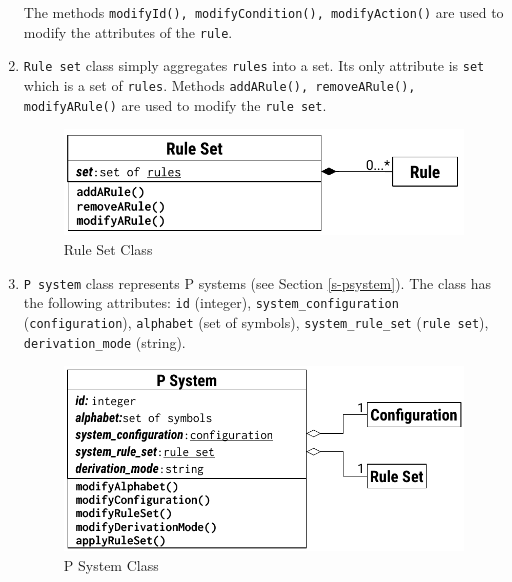 \documentclass{article}
\begin{document}
\begin{enumerate}
The methods \texttt{modifyId(), modifyCondition(), modifyAction()} are used to modify the attributes
of the \texttt{rule}.


\item \texttt{Rule set} class simply aggregates \texttt{rules} into a set. Its only attribute is
\texttt{set} which is a set of \texttt{rules}. Methods \texttt{addARule(), removeARule(),
modifyARule()} are used to modify the \texttt{rule set}.

\begin{figure}[H]
\begin{center}
    \includegraphics[scale=0.8]{figures/zzz-rule-set.pdf}
    \caption{Rule Set Class}
    \label{fig:rule-set}
\end{center}
\end{figure}


\item \texttt{P system} class represents P systems (see Section \ref{s-psystem}). The class has the
following attributes: \texttt{id} (integer), \texttt{system\_configuration} 
(\texttt{configuration}), \texttt{alphabet} (set of symbols), \texttt{system\_rule\_set} 
(\texttt{rule set}), \texttt{derivation\_mode} (string).

\begin{figure}[H]
\begin{center}
    \includegraphics[scale=0.8]{figures/zzz-p-system.pdf}
    \caption{P System Class}
    \label{fig:p-system}
\end{center}
\end{figure}


\end{enumerate}
\end{document}
